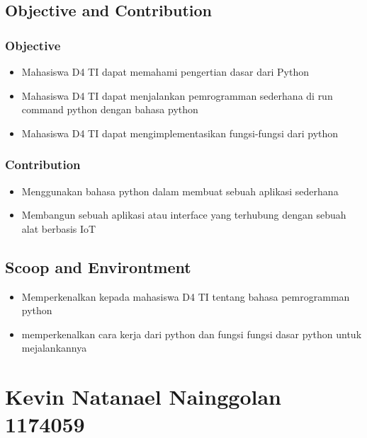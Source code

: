 \subsection{Objective and Contribution}
	\subsubsection{Objective}
	\begin{itemize}
	\item Mahasiswa D4 TI dapat memahami pengertian dasar dari Python
	\item Mahasiswa D4 TI dapat menjalankan pemrogramman sederhana di run command python dengan bahasa python
	\item Mahasiswa D4 TI dapat mengimplementasikan fungsi-fungsi dari python
\end{itemize}
	
\subsubsection{Contribution}
\begin{itemize}
	\item Menggunakan bahasa python dalam membuat sebuah aplikasi sederhana
	\item Membangun sebuah aplikasi atau interface yang terhubung dengan sebuah alat berbasis IoT
\end{itemize}

\subsection{Scoop and Environtment}
\begin{itemize}
	\item Memperkenalkan kepada mahasiswa D4 TI tentang bahasa pemrogramman python
	\item memperkenalkan cara kerja dari python dan fungsi fungsi dasar python untuk mejalankannya
\end{itemize}

\section{Kevin Natanael Nainggolan 1174059}
